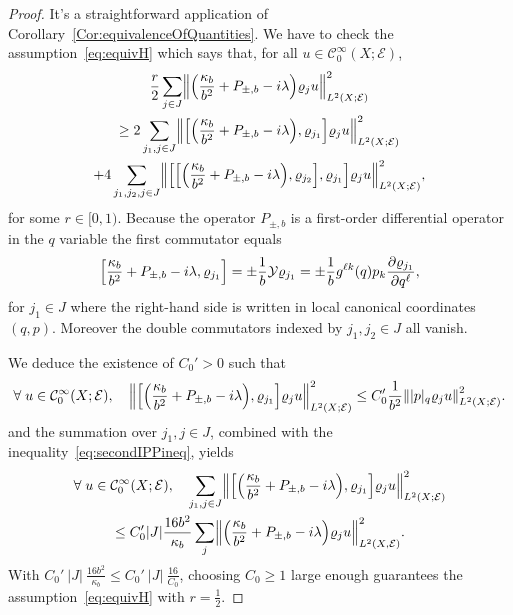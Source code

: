 \documentclass[10pt]{amsart}
\theoremstyle{definition}\newtheorem{defi}[theo]{Definition}\newtheorem{rema}[theo]{Remark}\newtheorem{exam}[theo]{Example}\newtheorem{exem}[theo]{Example}\newtheorem{nota}[theo]{Notation}
\newcommand{\clC}{\mathcal{C}}
\newcommand{\clY}{\mathcal{Y}}
\newcommand{\clE}{\mathcal{E}}
\let\oldforall\forall
\renewcommand*{\forall}{\mathrel{\oldforall}}
\let\originalleft\left
\let\originalright\right
\renewcommand{\left}{\mathopen{}\mathclose\bgroup\originalleft}
\renewcommand{\right}{\aftergroup\egroup\originalright}
\begin{document}
\begin{proof}
It's a straightforward application of Corollary~\ref{Cor:equivalenceOfQuantities}. We have to check the assumption~\eqref{eq:equivH} which says that, for all $u\in \clC^{\infty}_{0}(X;\clE)$,
\begin{multline*}
\frac{r}{2} \sum_{j\in J} \left\| \left(\frac{\kappa_{b}}{b^{2}} + P_{\pm,b} - i \lambda\right) \varrho_{j}u \right\|^{2}_{L^{2}(X;\clE)}\\
\geq 2 \sum_{j_{1},j\in J} \left\|\left[\left(\frac{\kappa_{b}}{b^{2}} + P_{\pm,b} - i \lambda\right), \varrho_{j_{1}}\right] \varrho_{j} u \right\|^{2}_{L^{2}(X;\clE)} \\
+ 4 \sum_{j_{1},j_{2},j\in J} \left\|\left[\left[\left(\frac{\kappa_{b}}{b^{2}} + P_{\pm,b} - i \lambda\right),\varrho_{j_{2}}\right],\varrho_{j_{1}}\right]\varrho_{j}u\right\|^{2}_{L^{2}(X;\clE)},
\end{multline*}
for some $r\in[0,1)$. Because the operator $P_{\pm,b}$ is a first-order differential operator in the $q$ variable the first commutator equals
\[
\left[\frac{\kappa_{b}}{b^{2}} + P_{\pm,b} - i \lambda, \varrho_{j_{1}}\right] = \pm \frac{1}{b}\clY\varrho_{j_{1}} = \pm\frac{1}{b}g^{\ell k}(q)p_{k} \frac{\partial \varrho_{j_{1}}}{\partial q^{\ell}},
\]
for $j_{1}\in J$ where the right-hand side is written in local canonical coordinates $(q,p)$. Moreover the double commutators indexed by $j_{1},j_{2}\in J$ all vanish.

We deduce the existence of $C_{0}'>0$ such that
\[
\forall u\in \clC^{\infty}_{0}(X;\clE),\quad\left\|\left[\left(\frac{\kappa_{b}}{b^{2}} + P_{\pm,b} - i \lambda\right), \varrho_{j_{1}}\right] \varrho_{j} u \right\|^{2}_{L^{2}(X;\clE)} \leq C_{0}'\frac{1}{b^{2}} \left\| |p|_{q} \varrho_{j} u \right\|_{L^{2}(X;\clE)}^{2}.
\]
and the summation over $j_{1},j\in J$, combined with the inequality~\eqref{eq:secondIPPineq}, yields
\begin{multline*}
\forall u\in \clC^{\infty}_{0}(X;\clE),\quad \sum_{j_{1},j\in J} \left\|\left[\left(\frac{\kappa_{b}}{b^{2}} + P_{\pm,b} - i \lambda\right), \varrho_{j_{1}}\right] \varrho_{j} u \right\|^{2}_{L^{2}(X;\clE)} \\
\leq C_{0}' |J| \frac{16b^{2}}{\kappa_{b}} \sum_{j} \left\| \left(\frac{\kappa_{b}}{b^{2}}+P_{\pm, b} - i \lambda\right) \varrho_{j}u \right\|^{2}_{L^{2}(X,\clE)}.
\end{multline*}
With $C_{0}'~|J|~\frac{16b^{2}}{\kappa_{b}}\leq C_{0}'~|J|~\frac{16}{C_{0}}$, choosing $C_{0}\geq 1$ large enough guarantees the assumption~\eqref{eq:equivH} with $r=\frac{1}{2}$.
\end{proof}
\end{document}
